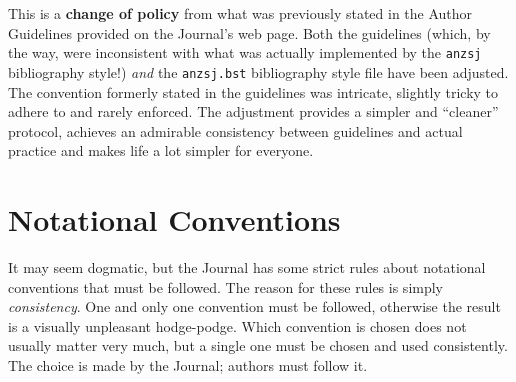 \documentclass[times, doublespace]{anzsauth}
\begin{document}
This is a \textbf{change of policy} from what was previously stated
in the Author Guidelines provided on the Journal's web page.
Both the guidelines (which, by the way, were inconsistent with
what was actually implemented by the \texttt{anzsj} bibliography
style!) \emph{and} the \texttt{anzsj.bst} bibliography style file
have been adjusted.  The convention formerly stated in the guidelines
was intricate, slightly tricky to adhere to and rarely enforced.
The adjustment provides a simpler and ``cleaner'' protocol, achieves
an admirable consistency between guidelines and actual practice
and makes life a lot simpler for everyone.

\section{Notational Conventions}
\label{sec:noteConv}
It may seem dogmatic, but the Journal has some strict rules
about notational conventions that must be followed.  The reason
for these rules is simply \emph{consistency}.  One and only one
convention must be followed, otherwise the result is a visually
unpleasant hodge-podge.  Which convention is chosen does not
usually matter very much, but a single one must be chosen and
used consistently.  The choice is made by the Journal; authors
must follow it.
\end{document}
